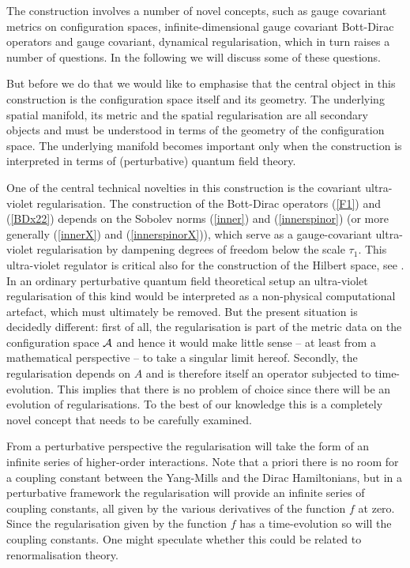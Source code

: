 \documentclass[letterpaper,11pt]{article}
\def\ca{{\cal A}}
\begin{document}
 

  The construction involves a number of novel concepts, such as gauge covariant metrics on configuration spaces, infinite-dimensional gauge covariant Bott-Dirac operators and gauge covariant, dynamical regularisation, which in turn raises a number of questions. In the following we will discuss some of these questions.

 But before we do that we would like to emphasise that the central object in this construction is the configuration space itself and its geometry. The underlying spatial manifold, its metric and the spatial regularisation are all secondary objects and must be understood in terms of the geometry of the configuration space. The underlying manifold becomes important only when the construction is interpreted in terms of (perturbative) quantum field theory.


One of the central technical novelties in this construction is the covariant ultra-violet regularisation. The construction of the Bott-Dirac operators (\ref{F1}) and (\ref{BDx22}) depends on the Sobolev norms (\ref{inner}) and (\ref{innerspinor}) (or more generally (\ref{innerX}) and (\ref{innerspinorX})), which serve as a gauge-covariant ultra-violet regularisation by dampening degrees of freedom below the scale $\tau_1$. This ultra-violet regulator is critical also for the construction of the Hilbert space, see \cite{Aastrup:2019yui}. In an ordinary perturbative quantum field theoretical setup an ultra-violet regularisation of this kind would be interpreted as a non-physical computational artefact, which must ultimately be removed. But the present situation is decidedly different: first of all, the regularisation is part of the metric data on the configuration space $\ca$ and hence it would make little sense -- at least from a mathematical perspective -- to take a singular limit hereof. Secondly, the regularisation depends on $A$ and is therefore itself an operator subjected to time-evolution. This implies that there is no problem of choice since there will be an evolution of regularisations. 
To the best of our knowledge this is a completely novel concept that needs to be carefully examined. 

From a perturbative perspective the regularisation will take the form of an infinite series of higher-order interactions. Note that a priori there is no room for a coupling constant between the Yang-Mills and the Dirac Hamiltonians, but in a perturbative framework the regularisation will provide an infinite series of coupling constants, all given by the various derivatives of the function $f$ at zero. Since the regularisation given by the function $f$ has a time-evolution so will the coupling constants. One might speculate whether this could be related to renormalisation theory.
\end{document}
